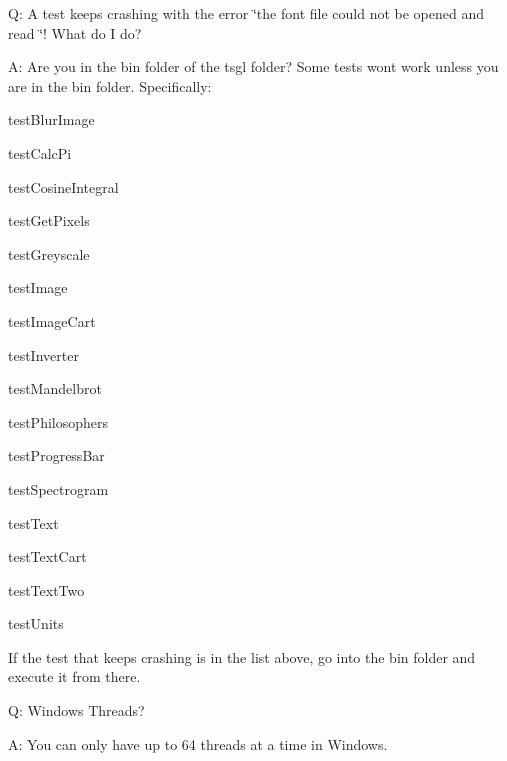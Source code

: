 Q\+: A test keeps crashing with the error \char`\"{}the font file could not be opened and read
\char`\"{}! What do I do?

A\+: Are you in the bin folder of the tsgl folder? Some tests won\textquotesingle{}t work unless you are in the bin folder. Specifically\+:
\begin{DoxyItemize}
\item test\+Blur\+Image
\item test\+Calc\+Pi
\item test\+Cosine\+Integral
\item test\+Get\+Pixels
\item test\+Greyscale
\item test\+Image
\item test\+Image\+Cart
\item test\+Inverter
\item test\+Mandelbrot
\item test\+Philosophers
\item test\+Progress\+Bar
\item test\+Spectrogram
\item test\+Text
\item test\+Text\+Cart
\item test\+Text\+Two
\item test\+Units
\end{DoxyItemize}

If the test that keeps crashing is in the list above, go into the bin folder and execute it from there.

Q\+: Windows Threads?

A\+: You can only have up to 64 threads at a time in Windows. 